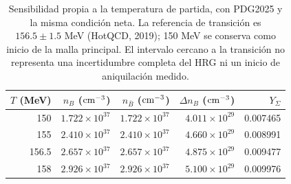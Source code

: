 \begin{table}[t]\centering\small
\caption{Sensibilidad propia a la temperatura de partida, con PDG2025 y la misma condición neta. La referencia de transición es $156.5\pm1.5$ MeV (HotQCD, 2019); 150 MeV se conserva como inicio de la malla principal. El intervalo cercano a la transición no representa una incertidumbre completa del HRG ni un inicio de aniquilación medido.}\label{tab:initialT}
\setlength{\tabcolsep}{11pt}\renewcommand{\arraystretch}{1.14}
\begin{tabular}{rrrrr}\toprule
$T$ (MeV) & $n_B$ (${\rm cm^{-3}}$) & $n_{\bar B}$ (${\rm cm^{-3}}$) & $\Delta n_B$ (${\rm cm^{-3}}$) & $Y_\Sigma$ \\ \midrule
150 & $1.722\times10^{37}$ & $1.722\times10^{37}$ & $4.011\times10^{29}$ & 0.007465 \\
155 & $2.410\times10^{37}$ & $2.410\times10^{37}$ & $4.660\times10^{29}$ & 0.008991 \\
156.5 & $2.657\times10^{37}$ & $2.657\times10^{37}$ & $4.875\times10^{29}$ & 0.009477 \\
158 & $2.926\times10^{37}$ & $2.926\times10^{37}$ & $5.100\times10^{29}$ & 0.009976 \\
\bottomrule\end{tabular}\end{table}
